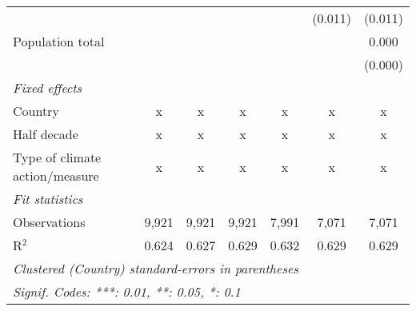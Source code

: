 \begin{tabular}{lcccccc}
                                                                                              &         &               &                &                & (0.011)        & (0.011)\\   
   Population total                                                                           &         &               &                &                &                & 0.000\\   
                                                                                              &         &               &                &                &                & (0.000)\\   
   \emph{Fixed effects}\\
   Country                                                                                    & x       & x             & x              & x              & x              & x\\  
   Half decade                                                                                & x       & x             & x              & x              & x              & x\\  
   Type of climate action/measure                                                             & x       & x             & x              & x              & x              & x\\  
   \midrule \emph{Fit statistics}\\
   Observations                                                                               & 9,921   & 9,921         & 9,921          & 7,991          & 7,071          & 7,071\\  
   R$^2$                                                                                      & 0.624   & 0.627         & 0.629          & 0.632          & 0.629          & 0.629\\  
   \midrule
   \multicolumn{7}{l}{\emph{Clustered (Country) standard-errors in parentheses}}\\
   \multicolumn{7}{l}{\emph{Signif. Codes: ***: 0.01, **: 0.05, *: 0.1}}\\
\end{tabular}
\par\endgroup


